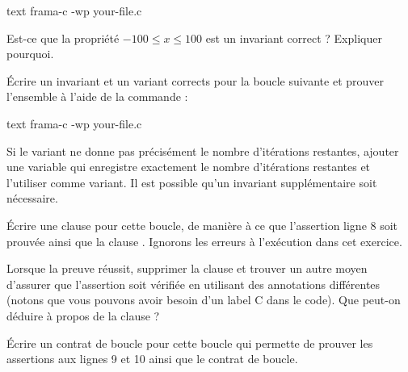 \begin{CodeBlock}{text}
frama-c -wp your-file.c
\end{CodeBlock}




Est-ce que la propriété $-100 \leq x \leq 100$ est un invariant correct ?
Expliquer pourquoi.





Écrire un invariant et un variant corrects pour la boucle suivante et prouver
l'ensemble à l'aide de la commande :

\begin{CodeBlock}{text}
frama-c -wp your-file.c
\end{CodeBlock}




Si le variant ne donne pas précisément le nombre d'itérations restantes, ajouter
une variable qui enregistre exactement le nombre d'itérations restantes et l'utiliser
comme variant. Il est possible qu'un invariant supplémentaire soit nécessaire.





Écrire une clause  pour cette boucle, de manière à ce
que l'assertion ligne 8 soit prouvée ainsi que la clause .
Ignorons les erreurs à l'exécution dans cet exercice.





Lorsque la preuve réussit, supprimer la clause  et
trouver un autre moyen d'assurer que l'assertion soit vérifiée en utilisant des
annotations différentes (notons que vous pouvons avoir besoin d'un label C dans
le code). Que peut-on déduire à propos de la clause  ?




Écrire un contrat de boucle pour cette boucle qui permette de prouver les
assertions aux lignes 9 et 10 ainsi que le contrat de boucle.


